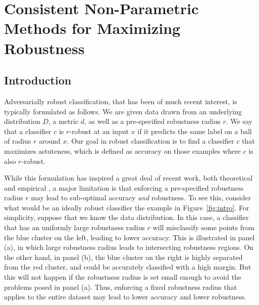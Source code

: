 \graphicspath{{./chapters/chapter1/}}
\def\supp{supp}
\def\D{{\mathcal D}}
\def\U{{\mathcal U}}
\def\V{{\mathcal V}}
\def\X{\mathcal X}
\def\R{\mathbb R}
\def\Y{\{\pm 1\}}
\def\d{\rho}
\def\E{\mathbb{E}}
\def\N{\mathbb{N}}
\def\g{g}
\def\A{\mathcal{A}}
\def\nat{g_{neighbor}}
\def\bad{\D_{1/2}^{-}}
\def\natural{neighborhood preserving}
\def\Natural{Neighborhood preserving}
\def\ncons{neighborhood}
\def\Ncons{Neighborhood}

\def\calD{\mathcal{D}}
\def\calU{\mathcal{U}}
\def\calV{\mathcal{V}}

\chapter{Consistent Non-Parametric Methods for Maximizing Robustness} 

\section{Introduction}
Adversarially robust classification, that has been of much recent interest, is typically formulated as follows. We are given data drawn from an underlying distribution $D$, a metric $d$, as well as a pre-specified robustness radius $r$. We say that a classifier $c$ is $r$-robust at an input $x$ if it predicts the same label on a ball of radius $r$ around $x$. Our goal in robust classification is to find a classifier $c$ that maximizes astuteness, which is defined as accuracy on those examples where $c$ is also $r$-robust. 

While this formulation has inspired a great deal of recent work, both theoretical and empirical \cite{Carlini17, Liu17, Papernot17, Papernot16,Szegedy14, Hein17,Schmidt18,Wu16,Steinhardt18, Sinha18, Yang20}, a major limitation is that enforcing a pre-specified robustness radius $r$ may lead to sub-optimal accuracy {\em{and}} robustness. To see this, consider what would be an ideally robust classifier the example in Figure~\ref{fig:intro}. For simplicity, suppose that we know the data distribution. In this case, a classifier that has an uniformly large robustness radius $r$ will misclassify some points from the blue cluster on the left, leading to lower accuracy. This is illustrated in panel (a), in which large robustness radius leads to intersecting robustness regions. On the other hand, in panel (b), the blue cluster on the right is highly separated from the red cluster, and could be accurately classified with a high margin. But this will not happen if the robustness radius is set small enough to avoid the problems posed in panel (a). Thus, enforcing a fixed robustness radius that applies to the entire dataset may lead to lower accuracy and lower robustness.

